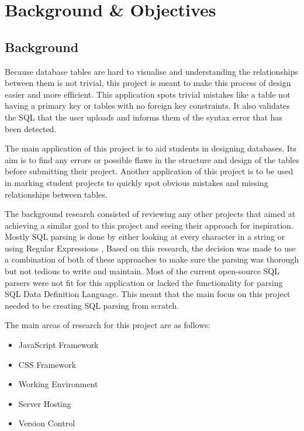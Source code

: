 
\chapter{Background \& Objectives}

\section{Background}

Because database tables are hard to visualise and understanding the relationships between them is not trivial, this project is meant to make this process of design easier and more efficient. This application spots trivial mistakes like a table not having a primary key or tables with no foreign key constraints. It also validates the SQL that the user uploads and informs them of the syntax error that has been detected.

The main application of this project is to aid students in designing databases. Its aim is to find any errors or possible flaws in the structure and design of the tables before submitting their project. Another application of this project is to be used in marking student projects to quickly spot obvious mistakes and missing relationships between tables.

The background research consisted of reviewing any other projects that aimed at achieving a similar goal to this project and seeing their approach for inspiration. Mostly SQL parsing is done by either looking at every character in a string or using Regular Expressions \cite{Regex}, Based on this research, the decision was made to use a combination of both of these approaches to make sure the parsing was thorough but not tedious to write and maintain. Most of the current open-source SQL parsers were not fit for this application or lacked the functionality for parsing SQL Data Definition Language. This meant that the main focus on this project needed to be creating SQL parsing from scratch.

The main areas of research for this project are as follows:

\begin{itemize}
	\item JavaScript Framework
	\item CSS Framework
	\item Working Environment
	\item Server Hosting
	\item Version Control
\end{itemize}

